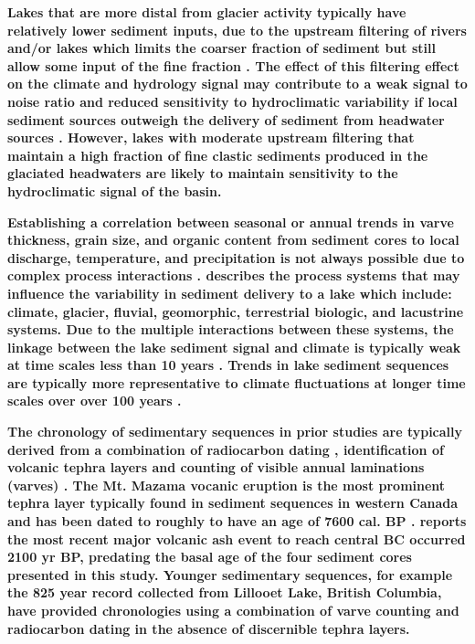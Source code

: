 \documentclass[Royal,times,doublespace,sageh]{sagej}
\begin{document}
\textbf{Lakes that are more distal from glacier activity typically have
relatively lower sediment inputs, due to the upstream filtering of
rivers and/or lakes which limits the coarser fraction of sediment but
still allow some input of the fine fraction \citep{Hodder2007c}. The
effect of this filtering effect on the climate and hydrology signal may
contribute to a weak signal to noise ratio and reduced sensitivity to
hydroclimatic variability if local sediment sources outweigh the
delivery of sediment from headwater sources \citep{Jerolmack2010}.
However, lakes with moderate upstream filtering that maintain a high
fraction of fine clastic sediments produced in the glaciated headwaters
are likely to maintain sensitivity to the hydroclimatic signal of the
basin.}

\textbf{Establishing a correlation between seasonal or annual trends in
varve thickness, grain size, and organic content from sediment cores to
local discharge, temperature, and precipitation is not always possible
due to complex process interactions
\citep{Hodder2007c, Menounos2008c, Heideman2017}. \citet{Hodder2007c}
describes the process systems that may influence the variability in
sediment delivery to a lake which include: climate, glacier, fluvial,
geomorphic, terrestrial biologic, and lacustrine systems. Due to the
multiple interactions between these systems, the linkage between the
lake sediment signal and climate is typically weak at time scales less
than 10 years \citep{Hodder2007c, Menounos2008c, Heideman2017}. Trends
in lake sediment sequences are typically more representative to climate
fluctuations at longer time scales over over 100 years
\citep{Leonard1999, Osborn2007, Heideman2017}.}

\textbf{The chronology of sedimentary sequences in prior studies are
typically derived from a combination of radiocarbon dating
\citep{Gilbert2012, Hodder2006b, Steinman2019}, identification of
volcanic tephra layers \citep{Gilbert2012, Hodder2006b, Steinman2019}
and counting of visible annual laminations (varves)
\citep{Hodder2006b, Heideman2015}. The Mt. Mazama vocanic eruption is
the most prominent tephra layer typically found in sediment sequences in
western Canada \citep{Gilbert2012, Steinman2019} and has been dated to
roughly to have an age of 7600 cal. BP
\citep{Zdanowicz1999, Hallett1997}. \citet{Westgate1977} reports the
most recent major volcanic ash event to reach central BC occurred 2100
yr BP, predating the basal age of the four sediment cores presented in
this study. Younger sedimentary sequences, for example the 825 year
record collected from Lillooet Lake, British Columbia, have provided
chronologies using a combination of varve counting and radiocarbon
dating in the absence of discernible tephra layers.}
\end{document}

